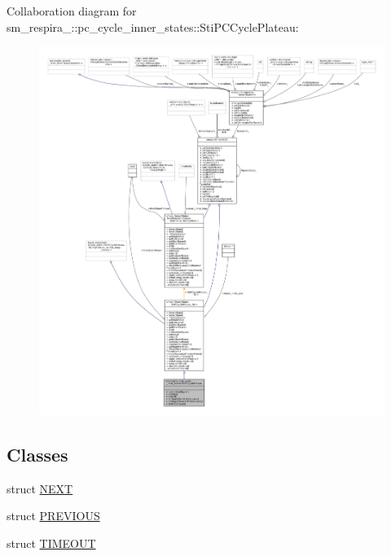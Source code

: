 Collaboration diagram for sm\+\_\+respira\+\_\+:\+:pc\+\_\+cycle\+\_\+inner\+\_\+states\+:\+:Sti\+P\+C\+Cycle\+Plateau\+:
\nopagebreak
\begin{figure}[H]
\begin{center}
\leavevmode
\includegraphics[width=350pt]{structsm__respira__1_1_1pc__cycle__inner__states_1_1StiPCCyclePlateau__coll__graph}
\end{center}
\end{figure}
\subsection*{Classes}
\begin{DoxyCompactItemize}
\item 
struct \hyperlink{structsm__respira__1_1_1pc__cycle__inner__states_1_1StiPCCyclePlateau_1_1NEXT}{N\+E\+XT}
\item 
struct \hyperlink{structsm__respira__1_1_1pc__cycle__inner__states_1_1StiPCCyclePlateau_1_1PREVIOUS}{P\+R\+E\+V\+I\+O\+US}
\item 
struct \hyperlink{structsm__respira__1_1_1pc__cycle__inner__states_1_1StiPCCyclePlateau_1_1TIMEOUT}{T\+I\+M\+E\+O\+UT}
\end{DoxyCompactItemize}
